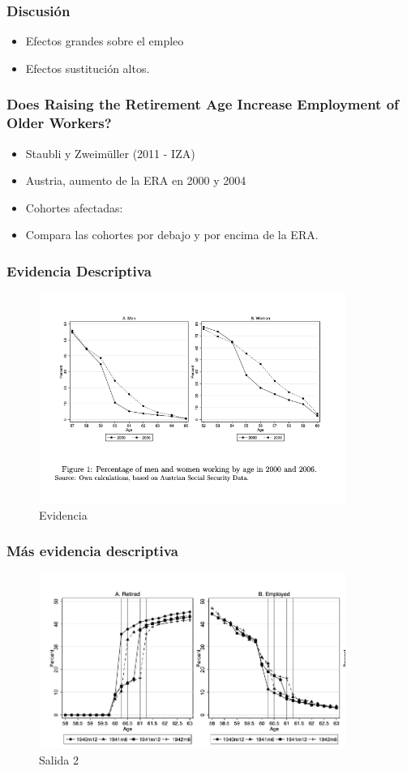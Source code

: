 \documentclass{beamer}
\begin{document}
  \frame
  {
    \frametitle{Discusión}
      \begin{itemize}
      \item Efectos grandes sobre el empleo
      \item Efectos sustitución altos.
      \end{itemize}

  }
  
  \frame
  {
    \frametitle{Does Raising the Retirement Age Increase Employment of Older Workers?}
    \begin{itemize}
    \item Staubli y Zweimüller (2011 - IZA)
    \item Austria, aumento de la ERA en 2000 y 2004
    \item Cohortes afectadas:
    \item Compara las cohortes por debajo y por encima de la ERA.
    \end{itemize}
  }
  \frame
  {
    \frametitle{Evidencia Descriptiva}
      \begin{figure}[htp]
        \centering
        \includegraphics[width=10cm]{imgs/staubli-fig1}
        \caption{Evidencia}
        \label{fig:fig2}
      \end{figure}
  }
  \frame
  {
    \frametitle{Más evidencia descriptiva}
      \begin{figure}[htp]
        \centering
        \includegraphics[width=10cm]{imgs/staubli-fig4}
        \caption{Salida 2}
        \label{fig:fig2}
      \end{figure}
  }
\end{document}
